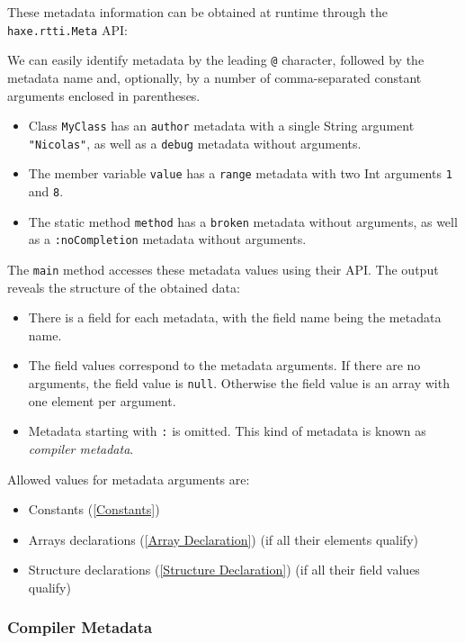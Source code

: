 \documentclass{article}
\newcommand{\type}[1]{\texttt{#1}}
\newcommand{\expr}[1]{\texttt{#1}}
\newcommand{\tref}[2]{#1 (\ref{#2})}
\newcommand{\haxe}[2][]{%
}
\begin{document}
These metadata information can be obtained at runtime through the \type{haxe.rtti.Meta} API:

\haxe{assets/Meta.hx}

We can easily identify metadata by the leading \expr{@} character, followed by the metadata name and, optionally, by a number of comma-separated constant arguments enclosed in parentheses.

\begin{itemize}
	\item Class \type{MyClass} has an \expr{author} metadata with a single String argument \expr{"Nicolas"}, as well as a \expr{debug} metadata without arguments.
	\item The member variable \expr{value} has a \expr{range} metadata with two Int arguments \expr{1} and \expr{8}.
	\item The static method \expr{method} has a \expr{broken} metadata without arguments, as well as a \expr{:noCompletion} metadata without arguments.
\end{itemize}

The \expr{main} method accesses these metadata values using their API. The output reveals the structure of the obtained data:

\begin{itemize}
	\item There is a field for each metadata, with the field name being the metadata name.
	\item The field values correspond to the metadata arguments. If there are no arguments, the field value is \expr{null}. Otherwise the field value is an array with one element per argument.
	\item Metadata starting with \expr{:} is omitted. This kind of metadata is known as \emph{compiler metadata}.
\end{itemize}

Allowed values for metadata arguments are:

\begin{itemize}
	\item \tref{Constants}{Constants}
	\item \tref{Arrays declarations}{Array Declaration} (if all their elements qualify)
	\item \tref{Structure declarations}{Structure Declaration} (if all their field values qualify)
\end{itemize}

\subsubsection{Compiler Metadata}
\end{document}
